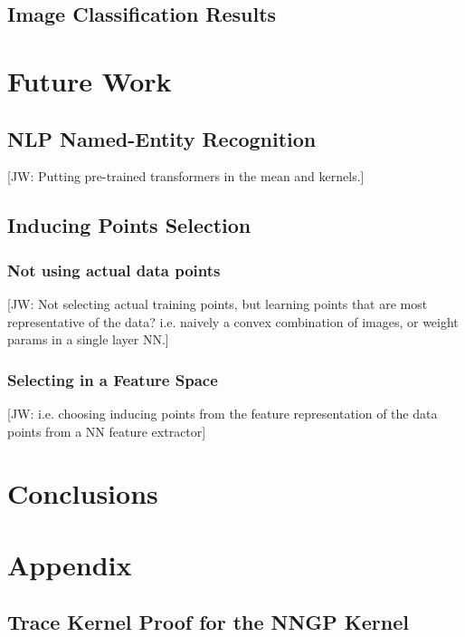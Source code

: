 \documentclass{article}
\newcommand{\jw}[1]{{\color{gray} [JW: #1]}}
\numberwithin{equation}{section}
\begin{document}
\subsection{Image Classification Results}

\newpage
\section{Future Work}
\subsection{NLP Named-Entity Recognition}
\jw{Putting pre-trained transformers in the mean and kernels.} 


\subsection{Inducing Points Selection}
\subsubsection{Not using actual data points}
\jw{Not selecting actual training points, but learning points that are most representative of the data? i.e. naively a convex combination of images, or weight params in a single layer NN.}
\subsubsection{Selecting in a Feature Space}
\jw{i.e. choosing inducing points from the feature representation of the data points from a NN feature extractor}


\newpage
\section{Conclusions}

\newpage



\newpage
\appendix
\section{Appendix}

\subsection{Trace Kernel Proof for the NNGP Kernel}\label{svgp-kld-bayesian}
\end{document}
